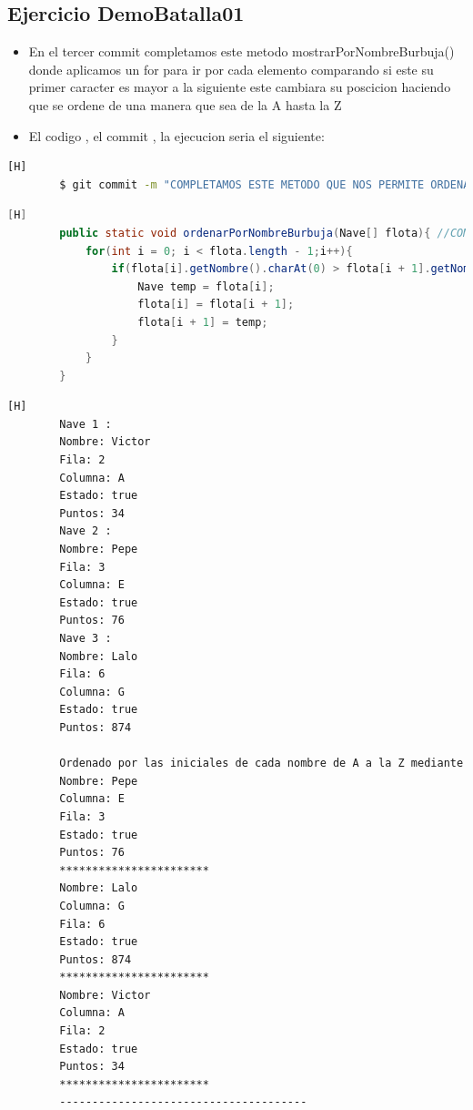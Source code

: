 \documentclass{article}
\begin{document}
	\subsection{Ejercicio DemoBatalla01}
	\begin{itemize}	
		\item En el tercer commit completamos este metodo mostrarPorNombreBurbuja() donde aplicamos un for para ir por cada elemento comparando si este su primer caracter es mayor a la siguiente este cambiara su poscicion haciendo que se ordene de una manera que sea de la A hasta la Z
		\item El codigo , el commit , la ejecucion seria el siguiente:
	\end{itemize}
	\begin{lstlisting}[language=bash,caption={Commit}][H]
		$ git commit -m "COMPLETAMOS ESTE METODO QUE NOS PERMITE ORDENAR DE A HASTA Z PARA ESTO COMPARAMOS EL PRIMER CARACTER DE CADA UNA Y SI ESTA ACTUAL ES MAYOR A LA SIGUIENTE ESTA CAMBIARA DE POSICION"
	\end{lstlisting}
	\begin{lstlisting}[language=java,caption={Las lineas de codigo del metodo completado:}][H]
		public static void ordenarPorNombreBurbuja(Nave[] flota){ //COMPLETAMOS ESTE METODO QUE NOS PERMITE ORDENAR DE A HASTA Z PARA ESTO COMPARAMOS EL PRIMER CARACTER DE CADA UNA Y SI ESTA ACTUAL ES MAYOR A LA SIGUIENTE ESTA CAMBIARA DE POSICION
			for(int i = 0; i < flota.length - 1;i++){
				if(flota[i].getNombre().charAt(0) > flota[i + 1].getNombre().charAt(0)){
					Nave temp = flota[i];
					flota[i] = flota[i + 1];
					flota[i + 1] = temp;
				}
			}
		}
	\end{lstlisting}
    \begin{lstlisting}[language=bash,caption={La ejecucion dada:}][H]
		Nave 1 : 
		Nombre: Victor 
		Fila: 2
		Columna: A
		Estado: true
		Puntos: 34
		Nave 2 : 
		Nombre: Pepe
		Fila: 3
		Columna: E
		Estado: true
		Puntos: 76
		Nave 3 : 
		Nombre: Lalo
		Fila: 6
		Columna: G
		Estado: true
		Puntos: 874
            
		Ordenado por las iniciales de cada nombre de A a la Z mediante el metodo burbuja: 
		Nombre: Pepe
		Columna: E
		Fila: 3
		Estado: true
		Puntos: 76
		***********************
		Nombre: Lalo
		Columna: G
		Fila: 6
		Estado: true
		Puntos: 874
		***********************
		Nombre: Victor
		Columna: A
		Fila: 2
		Estado: true
		Puntos: 34
		***********************
		--------------------------------------

    \end{lstlisting}
\end{document}
